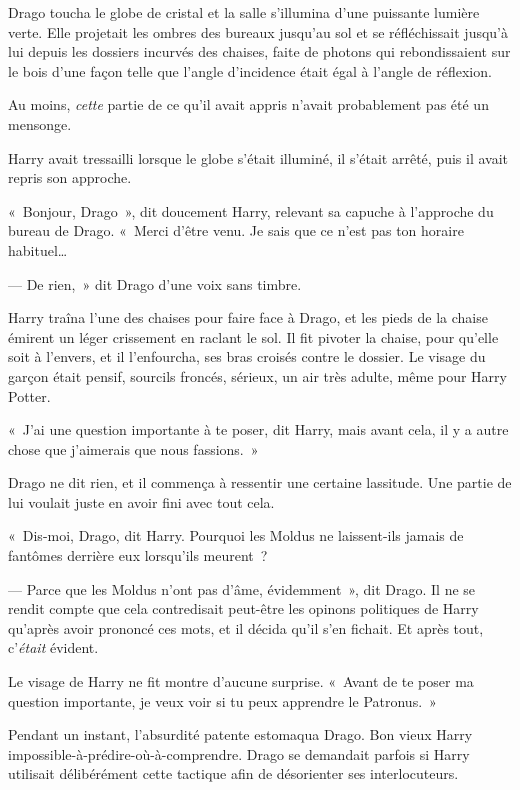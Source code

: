 Drago toucha le globe de cristal et la salle s'illumina d'une puissante lumière verte. Elle projetait les ombres des bureaux jusqu'au sol et se réfléchissait jusqu'à lui depuis les dossiers incurvés des chaises, faite de photons qui rebondissaient sur le bois d'une façon telle que l'angle d'incidence était égal à l'angle de réflexion.

Au moins, \emph{cette} partie de ce qu'il avait appris n'avait probablement pas été un mensonge.

Harry avait tressailli lorsque le globe s'était illuminé, il s'était arrêté, puis il avait repris son approche.

«~Bonjour, Drago~», dit doucement Harry, relevant sa capuche à l'approche du bureau de Drago. «~Merci d'être venu. Je sais que ce n'est pas ton horaire habituel…

--- De rien,~» dit Drago d'une voix sans timbre.

Harry traîna l'une des chaises pour faire face à Drago, et les pieds de la chaise émirent un léger crissement en raclant le sol. Il fit pivoter la chaise, pour qu'elle soit à l'envers, et il l'enfourcha, ses bras croisés contre le dossier. Le visage du garçon était pensif, sourcils froncés, sérieux, un air très adulte, même pour Harry Potter.

«~J'ai une question importante à te poser, dit Harry, mais avant cela, il y a autre chose que j'aimerais que nous fassions.~»

Drago ne dit rien, et il commença à ressentir une certaine lassitude. Une partie de lui voulait juste en avoir fini avec tout cela.

«~Dis-moi, Drago, dit Harry. Pourquoi les Moldus ne laissent-ils jamais de fantômes derrière eux lorsqu'ils meurent~?

--- Parce que les Moldus n'ont pas d'âme, évidemment~», dit Drago. Il ne se rendit compte que cela contredisait peut-être les opinons politiques de Harry qu'après avoir prononcé ces mots, et il décida qu'il s'en fichait. Et après tout, c'\emph{était} évident.

Le visage de Harry ne fit montre d'aucune surprise. «~Avant de te poser ma question importante, je veux voir si tu peux apprendre le Patronus.~»

Pendant un instant, l'absurdité patente estomaqua Drago. Bon vieux Harry impossible-à-prédire-où-à-comprendre. Drago se demandait parfois si Harry utilisait délibérément cette tactique afin de désorienter ses interlocuteurs.

